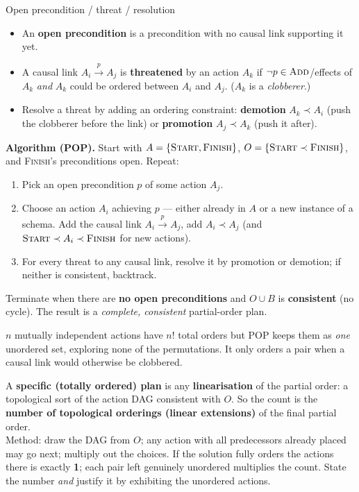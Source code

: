 \documentclass[11pt,a4paper]{article}
\newcommand{\pred}[1]{\textsc{#1}}
\newcommand{\add}{\textsc{Add}}
\begin{document}
\begin{defbox}{Open precondition / threat / resolution}
\begin{itemize}[leftmargin=*,itemsep=1pt]
  \item An \textbf{open precondition} is a precondition with no causal link supporting it yet.
  \item A causal link $A_i \xrightarrow{\,p\,} A_j$ is \textbf{threatened} by an action $A_k$ if $\neg p \in \add$/effects of $A_k$ \emph{and} $A_k$ could be ordered between $A_i$ and $A_j$. ($A_k$ is a \emph{clobberer}.)
  \item Resolve a threat by adding an ordering constraint:
        \textbf{demotion} $A_k \prec A_i$ (push the clobberer before the link) or
        \textbf{promotion} $A_j \prec A_k$ (push it after).
\end{itemize}
\end{defbox}

\textbf{Algorithm (POP).} Start with $A=\{\pred{Start},\pred{Finish}\}$, $O=\{\pred{Start}\prec\pred{Finish}\}$, and \pred{Finish}'s preconditions open. Repeat:
\begin{enumerate}[leftmargin=*,itemsep=1pt]
  \item Pick an open precondition $p$ of some action $A_j$.
  \item Choose an action $A_i$ achieving $p$ --- either already in $A$ or a new instance of a schema. Add the causal link $A_i \xrightarrow{\,p\,} A_j$, add $A_i\prec A_j$ (and $\pred{Start}\prec A_i \prec \pred{Finish}$ for new actions).
  \item For every threat to any causal link, resolve it by promotion or demotion; if neither is consistent, backtrack.
\end{enumerate}
Terminate when there are \textbf{no open preconditions} and $O\cup B$ is \textbf{consistent} (no cycle). The result is a \emph{complete, consistent} partial-order plan.

\begin{tcolorbox}[colback=gray!5,colframe=gray!50!black,title=Why POP --- least commitment]
$n$ mutually independent actions have $n!$ total orders but POP keeps them as \emph{one} unordered set, exploring none of the permutations. It only orders a pair when a causal link would otherwise be clobbered.
\end{tcolorbox}

\begin{tcolorbox}[colback=gray!5,colframe=gray!50!black,title=``How many specific plans can be extracted?'']
A \textbf{specific (totally ordered) plan} is any \textbf{linearisation} of the partial order: a topological sort of the action DAG consistent with $O$. So the count is the \textbf{number of topological orderings (linear extensions)} of the final partial order.\\[3pt]
Method: draw the DAG from $O$; any action with all predecessors already placed may go next; multiply out the choices. If the solution fully orders the actions there is exactly \textbf{1}; each pair left genuinely unordered multiplies the count. State the number \emph{and} justify it by exhibiting the unordered actions.
\end{tcolorbox}
\end{document}
